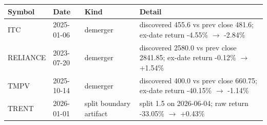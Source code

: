 \begin{tabular}{lllp{7.2cm}}
\toprule
Symbol & Date & Kind & Detail \\
\midrule
ITC & 2025-01-06 & demerger & discovered 455.6 vs prev close 481.6; ex-date return -4.55\% $\to$ -2.84\% \\
RELIANCE & 2023-07-20 & demerger & discovered 2580.0 vs prev close 2841.85; ex-date return -0.12\% $\to$ +1.54\% \\
TMPV & 2025-10-14 & demerger & discovered 400.0 vs prev close 660.75; ex-date return -40.15\% $\to$ -1.14\% \\
TRENT & 2026-01-01 & split boundary artifact & split 1.5 on 2026-06-04; raw return -33.05\% $\to$ +0.43\% \\
\bottomrule
\end{tabular}
